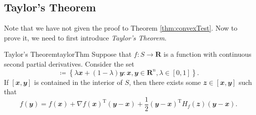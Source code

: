 \documentclass[math]{amznotes}
\theoremstyle{remark}
\begin{document}
\subsection{Taylor's Theorem}
Note that we have not given the proof to Theorem \ref{thm:convexTest}. Now to prove it, we need to first introduce \textit{Taylor's Theorem}.
\begin{thmbox}{Taylor's Theorem}{taylorThm}
    Suppose that $f \colon S \to \mathbf{R}$ is a function with continuous second partial derivatives. Consider the set
    \begin{displaymath}
        [\mathbfit{x}, \mathbfit{y}] \coloneqq \left\{\lambda\mathbfit{x} + (1 - \lambda)\mathbfit{y} \colon \mathbfit{x}, \mathbfit{y} \in \mathbf{R}^n, \lambda \in [0, 1]\right\}.
    \end{displaymath}
    If $[\mathbfit{x}, \mathbfit{y}]$ is contained in the interior of $S$, then there exists some $\mathbfit{z} \in [\mathbfit{x}, \mathbfit{y}]$ such that
    \begin{equation*}
        f(\mathbfit{y}) = f(\mathbfit{x}) + \nabla f(\mathbfit{x})^{\mathrm{T}}(\mathbfit{y - x}) + \frac{1}{2}(\mathbfit{y - x})^{\mathrm{T}}H_f(\mathbfit{z})(\mathbfit{y - x}).
    \end{equation*}
\end{thmbox}
\end{document}
